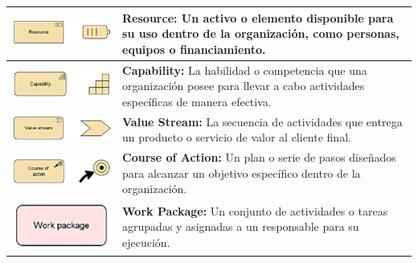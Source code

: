 \begin{longtable}{|c|p{8cm}|}
\hline
\includegraphics{anexos/ARCHI/strategy/resource.png} & 
\textbf{Resource:} Un activo o elemento disponible para su uso dentro de la organización, como personas, equipos o financiamiento. \\
\hline
\includegraphics{anexos/ARCHI/strategy/capability.png} & 
\textbf{Capability:} La habilidad o competencia que una organización posee para llevar a cabo actividades específicas de manera efectiva. \\
\hline
\includegraphics{anexos/ARCHI/strategy/stream.png} & 
\textbf{Value Stream:} La secuencia de actividades que entrega un producto o servicio de valor al cliente final. \\
\hline
\includegraphics{anexos/ARCHI/strategy/action.png} & 
\textbf{Course of Action:} Un plan o serie de pasos diseñados para alcanzar un objetivo específico dentro de la organización. \\
\hline
\includegraphics{anexos/ARCHI/strategy/work.png} & 
\textbf{Work Package:} Un conjunto de actividades o tareas agrupadas y asignadas a un responsable para su ejecución. \\

\end{longtable}
